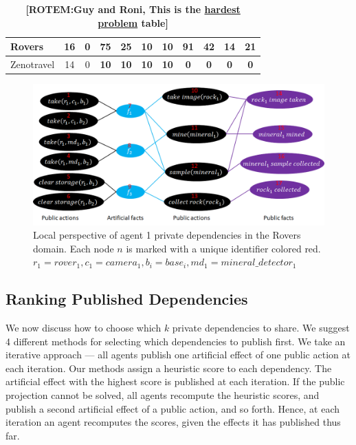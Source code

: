 \documentclass{article}
\newcommand{\rotem}[1]{\textbf{\color{red}[ROTEM:#1]}}
\theoremstyle{remark}
\begin{document}
{\begin{table}[ht]
\begin{tabular}{|l|c|c|c|c|c|c|c|c|c|c|}
Rovers                                                 & 16                                & 0                                 & 75                         & 25                         & \textbf{10}                & \textbf{10}                & 91                         & 42                         & \textbf{14}                & 21                         \\ \hline
Zenotravel                                             & 14                                & 0                                 & \textbf{10}                & \textbf{10}                & \textbf{10}                & \textbf{10}                & \textbf{0}                 & \textbf{0}                 & \textbf{0}                 & \textbf{0}                 \\ \hline
\end{tabular}
\caption{\rotem{Guy and Roni, This is the \underline{hardest problem} table}}
\label{table:optimalTableHardest}
\end{table}
}



\begin{figure}[ht]
    \centering
    \includegraphics[scale=0.4]{DependenciesGraphExample_Rovers}
    \caption{Local perspective of agent 1 private dependencies in the Rovers domain. Each node $n$ is marked with a unique identifier colored red. $r_1 = rover_1, c_1 = camera_1, b_i = base_i, md_1 = mineral\_detector_1$}
    \label{fig:dep}
\end{figure}


\subsection{Ranking Published Dependencies}
\label{scn:RankPublishedDep}

We now discuss how to choose which $k$ private dependencies to share. We suggest 4 different methods for selecting which dependencies to publish first. We take an iterative approach --- all agents publish one artificial effect of one public action at each iteration. Our methods assign a heuristic score to each dependency. The artificial effect with the highest score is published at each iteration. If the public projection cannot be solved, all agents recompute the heuristic scores, and publish a second artificial effect of a public action, and so forth. Hence, at each iteration an agent recomputes the scores, given the effects it has published thus far.
\end{document}
